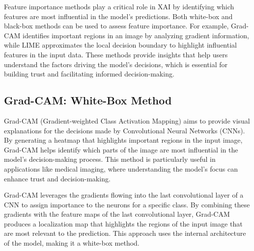 \documentclass{article}
\begin{document}
Feature importance methods play a critical role in XAI by identifying which features are most influential in the model’s predictions. Both white-box and black-box methods can be used to assess feature importance. For example, Grad-CAM identifies important regions in an image by analyzing gradient information, while LIME approximates the local decision boundary to highlight influential features in the input data. These methods provide insights that help users understand the factors driving the model’s decisions, which is essential for building trust and facilitating informed decision-making.



\subsection{Grad-CAM: White-Box Method}

Grad-CAM (Gradient-weighted Class Activation Mapping) aims to provide visual explanations for the decisions made by Convolutional Neural Networks (CNNs). By generating a heatmap that highlights important regions in the input image, Grad-CAM helps identify which parts of the image are most influential in the model’s decision-making process. This method is particularly useful in applications like medical imaging, where understanding the model’s focus can enhance trust and decision-making.

Grad-CAM leverages the gradients flowing into the last convolutional layer of a CNN to assign importance to the neurons for a specific class. By combining these gradients with the feature maps of the last convolutional layer, Grad-CAM produces a localization map that highlights the regions of the input image that are most relevant to the prediction. This approach uses the internal architecture of the model, making it a white-box method.
\end{document}
